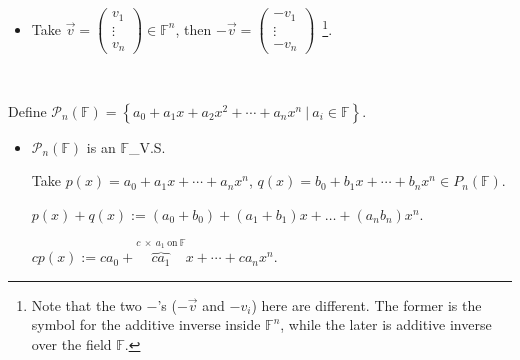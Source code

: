 \documentclass[11pt,fleqn]{book} %
\begin{document}
\begin{example}
\begin{itemize}
        \item Take $\vec{v} = \begin{pmatrix} v_1 \\ \vdots \\ v_n \end{pmatrix} \in \mathbb{F}^n$, then $-\vec{v} = \begin{pmatrix} -v_1 \\ \vdots \\ -v_n \end{pmatrix}$~\footnote{Note that the two $-$'s ($-\vec{v}$ and $-v_i$) here are different. The former is the symbol for the additive inverse inside $\mathbb{F}^n$, while the later is additive inverse over the field $\mathbb{F}$. }.
    \end{itemize}
\end{example}

\begin{example}
{~~~}

    Define $\mathcal{P}_n(\mathbb{F}) = \left\{ a_0 + a_1x + a_2x^2 + \cdots + a_nx^n ~|~a_i \in \mathbb{F} \right\}$.

    \begin{itemize}
        \item $\mathcal{P}_n(\mathbb{F})$ is an $\mathbb{F}$\_V.S.

        Take $p(x) = a_0 + a_1x + \cdots + a_nx^n$, $q(x)=b_0 + b_1x + \cdots + b_nx^n \in P_n(\mathbb{F})$.

        $p(x)+q(x):=(a_0+b_0)+(a_1+b_1)x+\dots+(a_nb_n)x^n$.

        $cp(x) := ca_0 + \overbrace{ca_1}^{c ~\times~ a_1 \mathrm{~on~}\mathbb{F}}x + \cdots + ca_nx^n$.
    \end{itemize}
\end{example}
\end{document}
